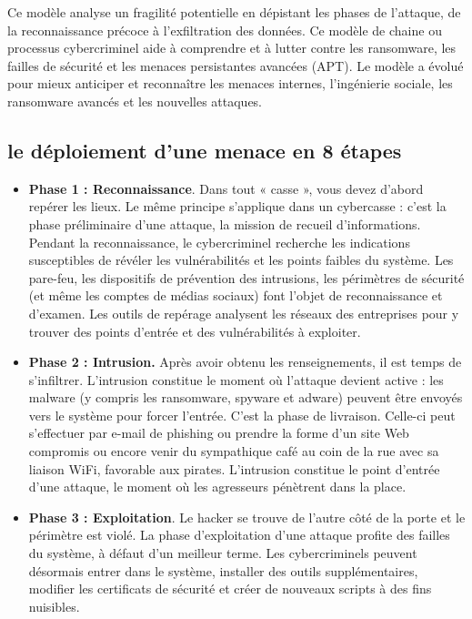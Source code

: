 Ce modèle analyse un fragilité potentielle en dépistant les phases de l’attaque, de la reconnaissance précoce à l’exfiltration des données. Ce modèle de chaine ou processus cybercriminel aide à comprendre et à lutter contre les ransomware, les failles de sécurité et les menaces persistantes avancées (APT). Le modèle a évolué pour mieux anticiper et reconnaître les menaces internes, l’ingénierie sociale, les ransomware avancés et les nouvelles attaques.

\subsection{le déploiement d'une menace en 8 étapes}


\begin{itemize}
  \item \textbf{Phase 1 : Reconnaissance}. Dans tout « casse », vous devez d’abord repérer les lieux. Le même principe s’applique dans un cybercasse : c’est la phase préliminaire d’une attaque, la mission de recueil d’informations. Pendant la reconnaissance, le cybercriminel recherche les indications susceptibles de révéler les vulnérabilités et les points faibles du système. Les pare-feu, les dispositifs de prévention des intrusions, les périmètres de sécurité (et même les comptes de médias sociaux) font l’objet de reconnaissance et d’examen. Les outils de repérage analysent les réseaux des entreprises pour y trouver des points d’entrée et des vulnérabilités à exploiter.

 \item \textbf{Phase 2 : Intrusion.} Après avoir obtenu les renseignements, il est temps de s’infiltrer. L’intrusion constitue le moment où l’attaque devient active : les malware (y compris les ransomware, spyware et adware) peuvent être envoyés vers le système pour forcer l’entrée. C’est la phase de livraison. Celle-ci peut s’effectuer par e-mail de phishing ou prendre la forme d’un site Web compromis ou encore venir du sympathique café au coin de la rue avec sa liaison WiFi, favorable aux pirates. L’intrusion constitue le point d’entrée d’une attaque, le moment où les agresseurs pénètrent dans la place.

 \item \textbf{Phase 3 : Exploitation}. Le hacker se trouve de l’autre côté de la porte et le périmètre est violé. La phase d’exploitation d’une attaque profite des failles du système, à défaut d’un meilleur terme. Les cybercriminels peuvent désormais entrer dans le système, installer des outils supplémentaires, modifier les certificats de sécurité et créer de nouveaux scripts à des fins nuisibles.


\end{itemize}
